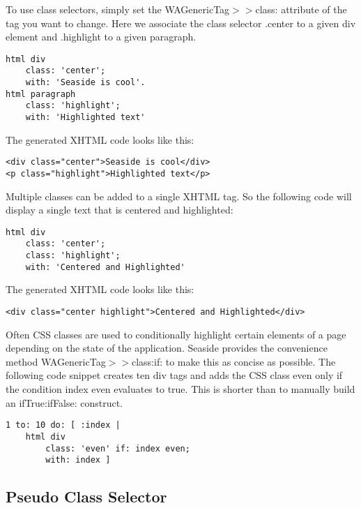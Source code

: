 \documentclass[a4paper,10pt,twoside]{book}
\newcommand{\ct}[1]{{\small\ttfamily\textup{#1}}}
\begin{document}
To use class selectors, simply set the  \ct{WAGenericTag$>$$>$class:} attribute of the tag you want to change. Here we associate the class selector \ct{.center} to a given div element and \ct{.highlight} to a given paragraph.

\begin{lstlisting}
html div
    class: 'center';
    with: 'Seaside is cool'.
html paragraph
    class: 'highlight';
    with: 'Highlighted text'
\end{lstlisting}

The generated XHTML code looks like this:

\begin{lstlisting}
<div class="center">Seaside is cool</div>
<p class="highlight">Highlighted text</p>
\end{lstlisting}

Multiple classes can be added to a single XHTML tag. So the following code will display a single text that is centered and highlighted:

\begin{lstlisting}
html div
    class: 'center';
    class: 'highlight';
    with: 'Centered and Highlighted'
\end{lstlisting}

The generated XHTML code looks like this:

\begin{lstlisting}
<div class="center highlight">Centered and Highlighted</div>
\end{lstlisting}

Often CSS classes are used to conditionally highlight certain elements of a page depending on the state of the application. Seaside provides the convenience method  \ct{WAGenericTag$>$$>$class:if:} to make this as concise as possible. The following code snippet creates ten \ct{div} tags and adds the CSS class \ct{even} only if the condition \ct{index even} evaluates to \ct{true}. This is shorter than to manually build an \ct{ifTrue:ifFalse:} construct.

\begin{lstlisting}
1 to: 10 do: [ :index |
    html div
        class: 'even' if: index even;
        with: index ]
\end{lstlisting}

\subsection{Pseudo Class Selector}
\label{book:fundamentals:css:selectors:pseudoclass}
\end{document}
